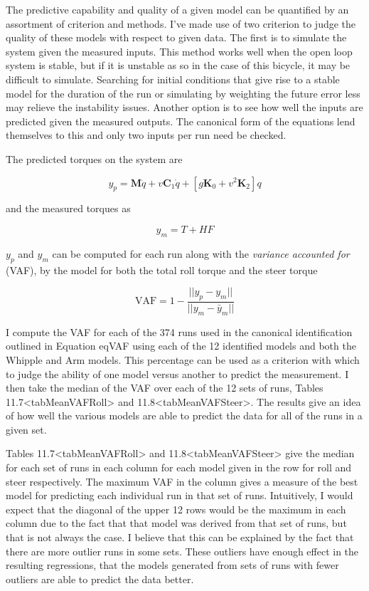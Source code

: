 \documentclass[a4paper]{article}
\begin{document}



The predictive capability and quality of a given model can be quantified
by an assortment of criterion and methods. I've made use of two
criterion to judge the quality of these models with respect to given
data. The first is to simulate the system given the measured inputs.
This method works well when the open loop system is stable, but if it is
unstable as so in the case of this bicycle, it may be difficult to
simulate. Searching for initial conditions that give rise to a stable
model for the duration of the run or simulating by weighting the future
error less may relieve the instability issues. Another option is to see
how well the inputs are predicted given the measured outputs. The
canonical form of the equations lend themselves to this and only two
inputs per run need be checked.

The predicted torques on the system are

\[y_p = \mathbf{M} \ddot{q} + v \mathbf{C}_1 \dot{q} + [g \mathbf{K}_0 + v^2
\mathbf{K}_2] q\]

and the measured torques as

\[y_m = T + H F\]

$y_p$ and $y_m$ can be computed for each run along with the
\emph{variance accounted for} (VAF), by the model for both the total
roll torque and the steer torque

\[\textrm{VAF} = 1 - \frac{\vert \vert y_p - y_m\vert \vert }{\vert \vert y_m - \bar{y}_m\vert \vert }\]

I compute the VAF for each of the 374 runs used in the canonical
identification outlined in Equation eqVAF using each of the 12
identified models and both the Whipple and Arm models. This percentage
can be used as a criterion with which to judge the ability of one model
versus another to predict the measurement. I then take the median of the
VAF over each of the 12 sets of runs, Tables
11.7\textless{}tabMeanVAFRoll\textgreater{} and
11.8\textless{}tabMeanVAFSteer\textgreater{}. The results give an idea
of how well the various models are able to predict the data for all of
the runs in a given set.

Tables 11.7\textless{}tabMeanVAFRoll\textgreater{} and
11.8\textless{}tabMeanVAFSteer\textgreater{} give the median for each
set of runs in each column for each model given in the row for roll and
steer respectively. The maximum VAF in the column gives a measure of the
best model for predicting each individual run in that set of runs.
Intuitively, I would expect that the diagonal of the upper 12 rows would
be the maximum in each column due to the fact that that model was
derived from that set of runs, but that is not always the case. I
believe that this can be explained by the fact that there are more
outlier runs in some sets. These outliers have enough effect in the
resulting regressions, that the models generated from sets of runs with
fewer outliers are able to predict the data better.
\end{document}
